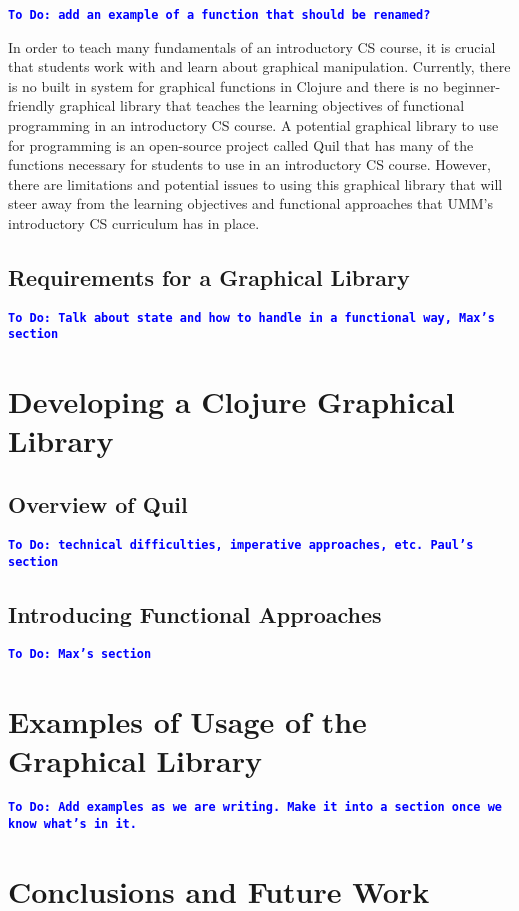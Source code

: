 \documentclass[12pt]{article}
\newcommand{\comment}[1]{{\bf \tt  {#1}}}
\newcommand{\todo}[1]{\textcolor{blue}{\comment{To Do: {#1}}}}
\begin{document}
\todo{add an example of a function that should be renamed?}

In order to teach many fundamentals of an introductory CS course, it is crucial that students work with and learn about graphical manipulation. Currently, there is no built in system for graphical functions in Clojure and there is no beginner-friendly graphical library that teaches the learning objectives of functional programming in an introductory CS course. A potential graphical library to use for programming is an open-source project called Quil that has many of the functions necessary for students to use in an introductory CS course. However, there are limitations and potential issues to using this graphical library that will steer away from the learning objectives and functional approaches that UMM’s introductory CS curriculum has in place.

\subsection{Requirements for a Graphical Library}\label{subsec:requirements}
\todo{Talk about state and how to handle in a functional way, Max's section}

\section{Developing a Clojure Graphical Library}\label{sec:library}

\subsection{Overview of Quil}\label{subsec:quil}
\todo{technical difficulties, imperative approaches, etc. Paul's section}

\subsection{Introducing Functional Approaches}\label{subsec:functional}
\todo{Max's section}

\section{Examples of Usage of the Graphical Library}\label{sec:usage}
\todo{Add examples as we are writing. Make it into a section once we know what's in it.}

\section{Conclusions and Future Work}\label{sec:future-work}


%
%

%  
%
%




\end{document}
